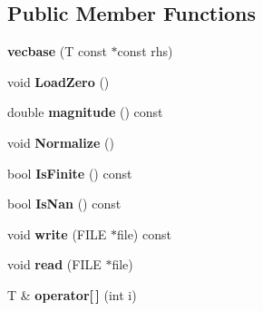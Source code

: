 \subsection*{Public Member Functions}
\begin{DoxyCompactItemize}
\item 
\hypertarget{classmath_1_1vecbase_ace789b2c8321e0d058b5cd143df2e439}{
{\bfseries vecbase} (T const $\ast$const rhs)}
\label{classmath_1_1vecbase_ace789b2c8321e0d058b5cd143df2e439}

\item 
\hypertarget{classmath_1_1vecbase_a79960000898a0987a7579fc40fca4bbd}{
void {\bfseries LoadZero} ()}
\label{classmath_1_1vecbase_a79960000898a0987a7579fc40fca4bbd}

\item 
\hypertarget{classmath_1_1vecbase_ac8e12f447b29967af11fb9f830fa08c2}{
double {\bfseries magnitude} () const }
\label{classmath_1_1vecbase_ac8e12f447b29967af11fb9f830fa08c2}

\item 
\hypertarget{classmath_1_1vecbase_ab620e8c531da5d6c86634fcb108646c1}{
void {\bfseries Normalize} ()}
\label{classmath_1_1vecbase_ab620e8c531da5d6c86634fcb108646c1}

\item 
\hypertarget{classmath_1_1vecbase_a7875c870c844f42aeaca952016a04bc7}{
bool {\bfseries IsFinite} () const }
\label{classmath_1_1vecbase_a7875c870c844f42aeaca952016a04bc7}

\item 
\hypertarget{classmath_1_1vecbase_a74f465a86765df211b97c716bc7162dc}{
bool {\bfseries IsNan} () const }
\label{classmath_1_1vecbase_a74f465a86765df211b97c716bc7162dc}

\item 
\hypertarget{classmath_1_1vecbase_a754b07a9163ae8746053ed8ca51e89c6}{
void {\bfseries write} (FILE $\ast$file) const }
\label{classmath_1_1vecbase_a754b07a9163ae8746053ed8ca51e89c6}

\item 
\hypertarget{classmath_1_1vecbase_a9759523e7304173f8ae57f3a9a30b37a}{
void {\bfseries read} (FILE $\ast$file)}
\label{classmath_1_1vecbase_a9759523e7304173f8ae57f3a9a30b37a}

\item 
\hypertarget{classmath_1_1vecbase_a80d2a8df6f5e4a6647531c98eb8fe595}{
T \& {\bfseries operator\mbox{[}$\,$\mbox{]}} (int i)}
\label{classmath_1_1vecbase_a80d2a8df6f5e4a6647531c98eb8fe595}

\end{DoxyCompactItemize}
